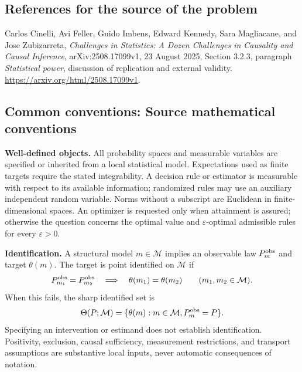 \documentclass[11pt,a4paper]{article}
\begin{document}
\subsection*{References for the source of the problem}
Carlos Cinelli, Avi Feller, Guido Imbens, Edward Kennedy, Sara Magliacane, and Jose Zubizarreta, \emph{Challenges in Statistics: A Dozen Challenges in Causality and Causal Inference}, arXiv:2508.17099v1, 23 August 2025, Section 3.2.3, paragraph \emph{Statistical power}, discussion of replication and external validity. \url{https://arxiv.org/html/2508.17099v1}.

\subsection*{Common conventions: Source mathematical conventions}

\textbf{Well-defined objects.}
All probability spaces and measurable variables are specified or inherited
from a local statistical model. Expectations used as finite targets require
the stated integrability. A decision rule or estimator is measurable with
respect to its available information; randomized rules may use an auxiliary
independent random variable. Norms without a subscript are Euclidean in
finite-dimensional spaces. An optimizer is requested only when attainment
is assured; otherwise the question concerns the optimal value and
$\varepsilon$-optimal admissible rules for every $\varepsilon>0$.

\textbf{Identification.}
A structural model $m\in\mathcal M$ implies an observable law
$P_m^{\rm obs}$ and target $\theta(m)$. The target is point identified on
$\mathcal M$ if
\[
 P_{m_1}^{\rm obs}=P_{m_2}^{\rm obs}
 \quad\Longrightarrow\quad\theta(m_1)=\theta(m_2)
 \qquad(m_1,m_2\in\mathcal M).
\]
When this fails, the sharp identified set is
\[
 \Theta(P;\mathcal M)=\{\theta(m):m\in\mathcal M,
                                  P_m^{\rm obs}=P\}.
\]
Specifying an intervention or estimand does not establish identification.
Positivity, exclusion, causal sufficiency, measurement restrictions, and
transport assumptions are substantive local inputs, never automatic
consequences of notation.
\end{document}
